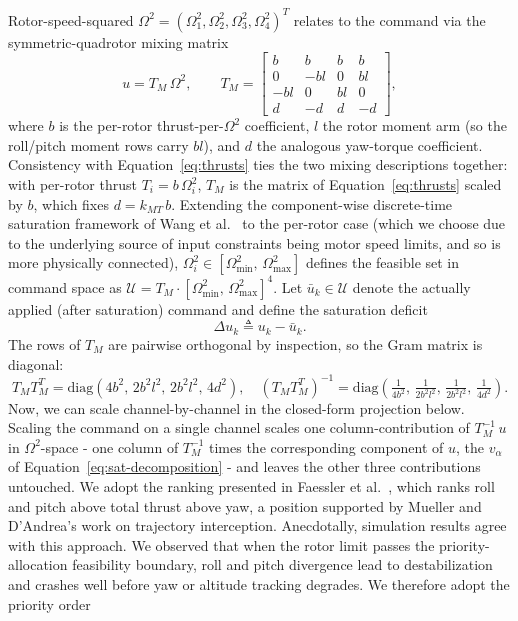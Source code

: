 \documentclass[conf]{new-aiaa}
\begin{document}
Rotor-speed-squared $\Omega^2 = (\Omega_1^2, \Omega_2^2, \Omega_3^2, \Omega_4^2)^T$ relates to the command via the symmetric-quadrotor mixing matrix
\small
\begin{equation}
\label{eq:sat-mixing}
u = T_M\, \Omega^2, \qquad
T_M = \begin{bmatrix}
b & b & b & b \\
0 & -bl & 0 & bl \\
-bl & 0 & bl & 0 \\
d & -d & d & -d
\end{bmatrix},
\end{equation}
\normalsize
where $b$ is the per-rotor thrust-per-$\Omega^2$ coefficient, $l$ the rotor moment arm (so the roll/pitch moment rows carry $bl$), and $d$ the analogous yaw-torque coefficient. Consistency with Equation~\ref{eq:thrusts} ties the two mixing descriptions together: with per-rotor thrust $T_i = b\, \Omega_i^2$, $T_M$ is the matrix of Equation~\ref{eq:thrusts} scaled by $b$, which fixes $d = k_{MT}\, b$. Extending the component-wise discrete-time saturation framework of Wang et al.\ \cite{refs:Wang2005} to the per-rotor case (which we choose due to the underlying source of input constraints being motor speed limits, and so is more physically connected), $\Omega_i^2 \in [\Omega^2_{\min},\, \Omega^2_{\max}]$ defines the feasible set in command space as $\mathcal{U} = T_M \cdot [\Omega^2_{\min},\, \Omega^2_{\max}]^4$. Let $\bar u_k \in \mathcal{U}$ denote the actually applied (after saturation) command and define the saturation deficit
\begin{equation}
\label{eq:sat-deficit}
\Delta u_k \triangleq u_k - \bar u_k.
\end{equation}
The rows of $T_M$ are pairwise orthogonal by inspection, so the Gram matrix is diagonal:
\small
\begin{equation}
\label{eq:sat-BBT}
T_M T_M^T = \mathrm{diag}\!\left(4 b^2,\, 2 b^2 l^2,\, 2 b^2 l^2,\, 4 d^2\right),
\quad
(T_M T_M^T)^{-1} = \mathrm{diag}\!\left(\tfrac{1}{4 b^2},\, \tfrac{1}{2 b^2 l^2},\, \tfrac{1}{2 b^2 l^2},\, \tfrac{1}{4 d^2}\right).
\end{equation}
\normalsize
Now, we can scale channel-by-channel in the closed-form projection below. Scaling the command on a single channel scales one column-contribution of $T_M^{-1}\,u$ in $\Omega^2$-space - one column of $T_M^{-1}$ times the corresponding component of $u$, the $v_\alpha$ of Equation~\ref{eq:sat-decomposition} - and leaves the other three contributions untouched. We adopt the ranking presented in Faessler et al.\ \cite{refs:Faessler2017}, which ranks roll and pitch above total thrust above yaw, a position supported by Mueller and D’Andrea's \cite{refs:Mueller2013} work on trajectory interception. Anecdotally, simulation results agree with this approach. We observed that when the rotor limit passes the priority-allocation feasibility boundary, roll and pitch divergence lead to destabilization and crashes well before yaw or altitude tracking degrades. We therefore adopt the priority order
\end{document}
